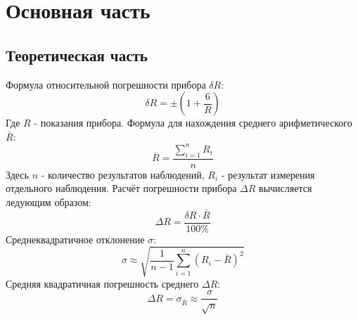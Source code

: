 \section{Основная часть}

\subsection{Теоретическая часть}
Формула относительной погрешности прибора $\delta R$:
\begin{equation}
    \delta R = \pm\left(1+\frac{6}{R}\right)
\end{equation}
Где $R$ - показания прибора. 
Формула для нахождения среднего арифметического $\bar{R}$:
\begin{equation}
    \bar{R}=\frac{\sum_{i=1}^{n} R_i}{n}
\end{equation}
Здесь $n$ - количество результатов наблюдений, $R_i$ - результат измерения отдельного наблюдения.
Расчёт погрешности прибора $\Delta R$ вычисляется ледующим образом:
\begin{equation}
    \Delta R = \frac{\delta R\cdot\bar{R}}{100\%}
\end{equation}
Среднеквадратичное отклонение $\sigma$:
\begin{equation}
    \sigma \approx \sqrt{\frac{1}{n-1}\sum_{i=1}^{n} (R_i-\bar{R})^2}
\end{equation}
Средняя квадратичная погрешность среднего $\Delta R$:
\begin{equation}
    \Delta R={\sigma}_{\bar{R}}\approx\frac{\sigma}{\sqrt{n}}
\end{equation}


